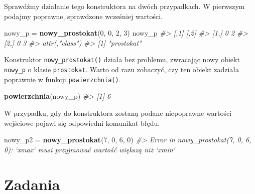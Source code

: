\documentclass[paper=6in:9in,pagesize=pdftex,headinclude=on,footinclude=on,10pt]{scrbook}
\newenvironment{Shaded}{\begin{snugshade}}{\end{snugshade}}
\newcommand{\CommentTok}[1]{\textcolor[rgb]{0.56,0.35,0.01}{\textit{#1}}}
\newcommand{\DecValTok}[1]{\textcolor[rgb]{0.00,0.00,0.81}{#1}}
\newcommand{\KeywordTok}[1]{\textcolor[rgb]{0.13,0.29,0.53}{\textbf{#1}}}
\newcommand{\NormalTok}[1]{#1}
\newcommand{\StringTok}[1]{\textcolor[rgb]{0.31,0.60,0.02}{#1}}
\begin{document}
Sprawdźmy działanie tego konstruktora na dwóch przypadkach.
W pierwszym podajmy poprawne, sprawdzone wcześniej wartości.

\begin{Shaded}
\begin{Highlighting}[]
\NormalTok{nowy_p =}\StringTok{ }\KeywordTok{nowy_prostokat}\NormalTok{(}\DecValTok{0}\NormalTok{, }\DecValTok{0}\NormalTok{, }\DecValTok{2}\NormalTok{, }\DecValTok{3}\NormalTok{)}
\NormalTok{nowy_p}
\CommentTok{#>      [,1] [,2]}
\CommentTok{#> [1,]    0    2}
\CommentTok{#> [2,]    0    3}
\CommentTok{#> attr(,"class")}
\CommentTok{#> [1] "prostokat"}
\end{Highlighting}
\end{Shaded}

Konstruktor \texttt{nowy\_prostokat()} działa bez problemu, zwracając nowy obiekt \texttt{nowy\_p} o klasie \texttt{prostokat}.
Warto od razu zobaczyć, czy ten obiekt zadziała poprawnie w funkcji \texttt{powierzchnia()}.

\begin{Shaded}
\begin{Highlighting}[]
\KeywordTok{powierzchnia}\NormalTok{(nowy_p)}
\CommentTok{#> [1] 6}
\end{Highlighting}
\end{Shaded}

W przypadku, gdy do konstruktora zostaną podane niepoprawne wartości wejściowe pojawi się odpowiedni komunikat błędu.

\begin{Shaded}
\begin{Highlighting}[]
\NormalTok{nowy_p2 =}\StringTok{ }\KeywordTok{nowy_prostokat}\NormalTok{(}\DecValTok{7}\NormalTok{, }\DecValTok{0}\NormalTok{, }\DecValTok{6}\NormalTok{, }\DecValTok{0}\NormalTok{)}
\CommentTok{#> Error in nowy_prostokat(7, 0, 6, 0): `xmax` musi przyjmować wartość większą niż `xmin`}
\end{Highlighting}
\end{Shaded}

\hypertarget{zadania-9}{%
\section{Zadania}\label{zadania-9}}
\end{document}
